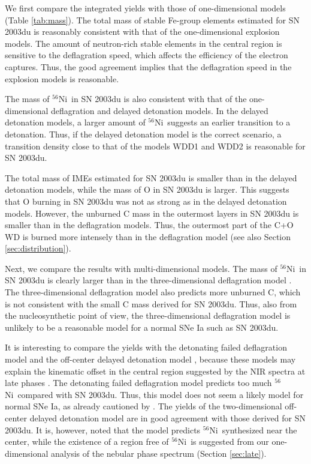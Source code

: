 \documentclass[usegraphicx,usenatbib]{mn2e}
\newcommand{\Nifs}{$^{56}$Ni}
\begin{document}
We first compare the integrated yields with those of one-dimensional models 
(Table \ref{tab:mass}).  The total mass of stable Fe-group elements estimated
for SN 2003du is reasonably consistent with that of the one-dimensional
explosion models. The amount of neutron-rich stable elements in the central
region is sensitive to the deflagration speed, which affects the efficiency of
the electron captures. 
Thus, the good agreement implies that the deflagration speed in the
explosion models is reasonable.

The mass of \Nifs\ in SN 2003du is also consistent with that of the
one-dimensional deflagration and delayed detonation models. In the delayed
detonation models, a larger amount of \Nifs\ suggests an earlier transition to a
detonation. Thus, if the delayed detonation model is the correct scenario, a
transition density close to that of the models WDD1 and WDD2 is reasonable for
SN 2003du.

The total mass of IMEs estimated for SN 2003du is smaller than in the delayed
detonation models, while the mass of O in SN 2003du is larger. This suggests
that O burning in SN 2003du was not as strong as in the delayed detonation
models. However, the unburned C mass in the outermost layers in SN 2003du is 
smaller than in the deflagration models. Thus, the outermost part of the C+O WD
is burned more intensely than in the deflagration model (see also Section
\ref{sec:distribution}).

Next, we compare the results with multi-dimensional models.
The mass of \Nifs\ in SN 2003du is clearly larger than in the three-dimensional
deflagration model \citep{travaglio04}. 
The three-dimensional deflagration model also predicts more 
unburned C, which is not consistent with the small C mass derived for SN 2003du.
Thus, also from the nucleosynthetic point of view, the three-dimensional
deflagration model is unlikely to be a reasonable model for a normal SNe Ia such
as SN 2003du.

It is interesting to compare the yields with the detonating failed deflagration
model \citep{plewa07} and the off-center delayed detonation model 
\citep{maeda10nuc},  because these models may explain the kinematic offset in
the central region suggested by the NIR spectra at late phases
\citep{hoeflich04,motohara06,maeda10neb}.  The detonating failed deflagration
model \citep{plewa07} predicts too much \Nifs\ compared with SN 2003du.  Thus,
this model does not seem a likely model for normal SNe Ia, as already cautioned
by \citet{meakin09}. The yields of the two-dimensional off-center delayed
detonation model  \citep{maeda10nuc} are in good agreement with those derived
for SN 2003du. It is, however, noted that the model predicts \Nifs\ synthesized
near the center, while the existence of a region free of \Nifs\ is  suggested
from our one-dimensional analysis of the nebular phase spectrum (Section
\ref{sec:late}).
\end{document}
